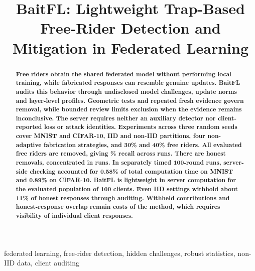 \documentclass[conference]{IEEEtran}
\title{BaitFL: Lightweight Trap-Based Free-Rider Detection and Mitigation in Federated Learning}
\author{\IEEEauthorblockN{Aashnan Rahman}
\IEEEauthorblockA{Department of Computer Science and Engineering\\
Islamic University of Technology}}
\makeatletter
\renewcommand{\section}{\@startsection{section}{1}{\z@}{1.5ex}{0.7ex}{\normalfont\normalsize\centering\scshape}}
\makeatother
\begin{document}
\maketitle
\raggedbottom
\setlength{\parskip}{0pt plus 2pt minus 0.5pt}
\makeatletter
\def\@textbottom{\vskip\z@ plus 6pt}
\makeatother
\setlength{\abovedisplayskip}{6pt plus 1pt minus 1pt}
\setlength{\belowdisplayskip}{6pt plus 1pt minus 1pt}
\setlength{\abovedisplayshortskip}{3pt plus 1pt minus 1pt}
\setlength{\belowdisplayshortskip}{3pt plus 1pt minus 1pt}
\begingroup\color{black}
\begin{abstract}
\bfseries
Free riders obtain the shared federated model without performing local
training, while fabricated responses can resemble genuine updates.
BaitFL audits this behavior through undisclosed model challenges,
update norms and layer-level profiles. Geometric tests and repeated fresh
evidence govern removal, while bounded review limits exclusion when
the evidence remains inconclusive. The server requires neither an
auxiliary detector nor client-reported loss or attack identities.
Experiments across three random seeds cover MNIST and CIFAR-10, IID and
non-IID partitions, four non-adaptive fabrication strategies, and 30\%
and 40\% free riders. All evaluated free riders are removed, giving
\MultiRecall\% recall across \ReviewRunCount{} runs. There are \MultiFP{}
honest removals, concentrated in \ReviewAffectedRuns{} runs. In separately
timed 100-round runs, server-side checking accounted for 0.58\% of total
computation time on MNIST and 0.89\% on CIFAR-10.
BaitFL is lightweight in server computation
for the evaluated population of 100 clients. Even IID settings withhold
about 11\% of honest responses through auditing. Withheld contributions
and honest-response overlap remain costs of the method, which requires
visibility of individual client responses.
\end{abstract}
\endgroup
\begin{IEEEkeywords}
federated learning, free-rider detection, hidden challenges, robust statistics,
non-IID data, client auditing
\end{IEEEkeywords}

\section{Introduction}
\end{document}
